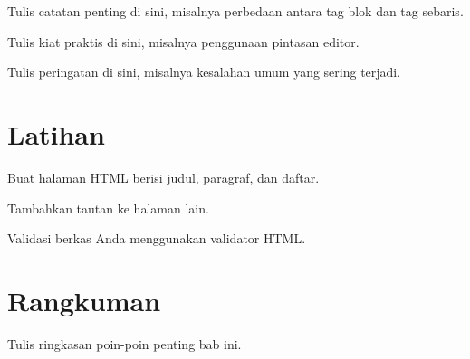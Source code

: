 \begin{catatan}
Tulis catatan penting di sini, misalnya perbedaan antara tag blok dan tag sebaris.
\end{catatan}

\begin{tip}
Tulis kiat praktis di sini, misalnya penggunaan pintasan editor.
\end{tip}

\begin{peringatan}
Tulis peringatan di sini, misalnya kesalahan umum yang sering terjadi.
\end{peringatan}

\section{Latihan}
\label{sec:latihan}

\begin{latihan}
  \item Buat halaman HTML berisi judul, paragraf, dan daftar.
  \item Tambahkan tautan ke halaman lain.
  \item Validasi berkas Anda menggunakan validator HTML.
\end{latihan}

\section{Rangkuman}
\label{sec:rangkuman}

Tulis ringkasan poin-poin penting bab ini.